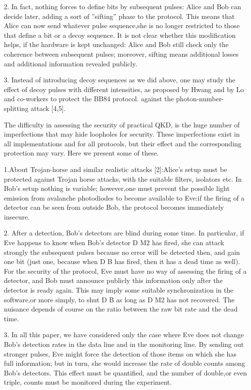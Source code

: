 2. In fact, nothing forces to define bits by subsequent pulses: Alice and Bob can decide later, adding a sort of ”sifting” phase to the protocol. This means that Alice can now send whatever pulse sequence,she is no longer restricted to those that define a bit or a decoy sequence. It is not clear whether this modification helps, if the hardware is kept unchanged: Alice and Bob still check only the coherence between subsequent pulses; moreover, sifting means additional losses and additional information revealed publicly.

3. Instead of introducing decoy sequences as we did above, one may study the effect of decoy pulses with different intensities, as proposed by Hwang and by Lo and co-workers to protect the BB84 protocol. against the photon-number-splitting attack [4,5].

The difficulty in assessing the security of practical QKD, is the huge number of imperfections that may hide loopholes for security. These imperfections exist in all implementations and for all protocols, but their effect and the corresponding protection may vary. Here we present some of these.

1.About Trojan-horse and similar realistic attacks [2]:Alice’s setup must be protected against Trojan horse attacks, with the suitable filters, isolators etc. In Bob’s setup nothing is variable; however,one must prevent the possible light emission from avalanche photodiodes to become available to Eve:if the firing of a detector can be seen from outside Bob, the protocol becomes immediately insecure.

2. After a detection, Bob’s detectors are blind during some time. In particular, if Eve happens to know when Bob’s detector D M2 has fired, she can attack strongly the subsequent pulses because no error will be detected then, and gain one bit (just one, because when D B has fired, then it has a dead time as well). For the security of the protocol, Eve must have no way of assessing the firing of a detector, and Bob must announce publicly this information only after the detector is ready again. This may imply some suitable synchronization in the software,or more simply, to shut D B as long as D M2 has not recovered. The nuisance depends of course on the ratio between the raw bit rate and the dead time.


3. In all this paper, we have considered only the case where Eve does not change Bob’s detection rates in the data line and in the monitoring line. By sending out stronger pulses, Eve might force the detection of those items on which she has full information; but in turn, she would increase the rate of double counts among Bob’s detectors. This effect must be quantified, and the number of double,or even triple, counts must be monitored during the experiment.

